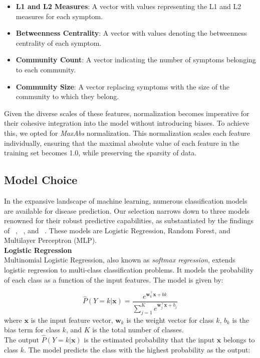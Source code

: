 \begin{itemize}
	\setlength\itemsep{1em} %
	\item \textbf{L1 and L2 Measures}: A vector with values representing the L1 and L2 measures for each symptom.
	\item \textbf{Betweenness Centrality}: A vector with values denoting the betweenness centrality of each symptom.
	\item \textbf{Community Count}: A vector indicating the number of symptoms belonging to each community.
	\item \textbf{Community Size}: A vector replacing symptoms with the size of the community to which they belong.
\end{itemize}
\noindent
Given the diverse scales of these features, normalization becomes imperative for their cohesive integration into the model
without introducing biases. To achieve this, we opted for \textit{MaxAbs} normalization. This normalization scales each feature
individually, ensuring that the maximal absolute value of each feature in the training set becomes 1.0, while preserving the sparsity of data.



\subsection{Model Choice}

In the expansive landscape of machine learning, numerous classification models are available for disease prediction.
Our selection narrows down to three models renowned for their robust predictive capabilities,
as substantiated by the findings of \citeauthor{Kohli}~\cite{Kohli}, \citeauthor{Singh}~\cite{Singh}, and \citeauthor{Uddin2019Dec}~\cite{Uddin2019Dec}.
These models are Logistic Regression, Random Forest, and Multilayer Perceptron (MLP).\\

\vspace{0.3cm}
\noindent
\textbf{Logistic Regression}\vspace{0.15cm}\\
Multinomial Logistic Regression, also known as \textit{softmax regression}, extends logistic regression to multi-class classification problems. It models the probability of each class as a function of the input features. The model is given by:

\begin{equation}
	\hat{P}(Y = k | \mathbf{x}) = \frac{e^{\mathbf{w}_k^\top \mathbf{x} + bk}}{\sum_{j=1}^{K} e^{\mathbf{w}_j^\top \mathbf{x} + b_j}}
\end{equation}
\noindent
where $\mathbf{x}$ is the input feature vector, $\mathbf{w}_k$ is the weight vector for class $k$, $b_k$ is the bias term for class $k$, and $K$ is the total number of classes.\\
The output $\hat{P}(Y = k | \mathbf{x})$ is the estimated probability that the input $\mathbf{x}$ belongs to class $k$. The model predicts the class with the highest probability as the output:

